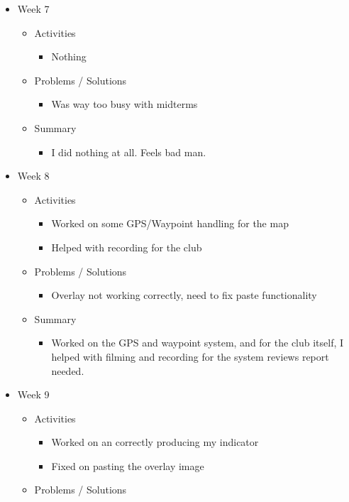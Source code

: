 \begin{itemize}
\begin{itemize}
\begin{itemize}
\end{itemize}
\end{itemize}
\item{Week 7}
\begin{itemize}
\item Activities
\begin{itemize}
\item Nothing
\end{itemize}
\item Problems / Solutions
\begin{itemize}
\item Was way too busy with midterms 
\end{itemize}
\item Summary
\begin{itemize}
\item I did nothing at all. Feels bad man.
\end{itemize}
\end{itemize}
\item{Week 8}
\begin{itemize}
\item Activities
\begin{itemize}
\item Worked on some GPS/Waypoint handling for the map
\item Helped with recording for the club
\end{itemize}
\item Problems / Solutions
\begin{itemize}
\item Overlay not working correctly, need to fix paste functionality
\end{itemize}
\item Summary
\begin{itemize}
\item Worked on the GPS and waypoint system, and for the club itself, I helped with filming and recording for the system reviews report needed.
\end{itemize}
\end{itemize}
\item{Week 9}
\begin{itemize}
\item Activities
\begin{itemize}
\item Worked on an correctly producing my indicator
\item Fixed on pasting the overlay image
\end{itemize}
\item Problems / Solutions

\end{itemize}
\end{itemize}
